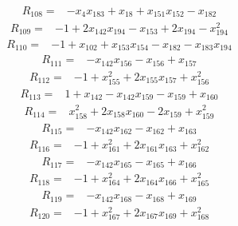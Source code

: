 \[
\begin{aligned}
R_{108}={}&-x_{4}x_{183}+x_{18}+x_{151}x_{152}-x_{182}
\end{aligned}
\]
\[
\begin{aligned}
R_{109}={}&-1+2x_{142}x_{194}-x_{153}+2x_{194}-x_{194}^{2}
\end{aligned}
\]
\[
\begin{aligned}
R_{110}={}&-1+x_{102}+x_{153}x_{154}-x_{182}-x_{183}x_{194}
\end{aligned}
\]
\[
\begin{aligned}
R_{111}={}&-x_{142}x_{156}-x_{156}+x_{157}
\end{aligned}
\]
\[
\begin{aligned}
R_{112}={}&-1+x_{155}^{2}+2x_{155}x_{157}+x_{156}^{2}
\end{aligned}
\]
\[
\begin{aligned}
R_{113}={}&1+x_{142}-x_{142}x_{159}-x_{159}+x_{160}
\end{aligned}
\]
\[
\begin{aligned}
R_{114}={}&x_{158}^{2}+2x_{158}x_{160}-2x_{159}+x_{159}^{2}
\end{aligned}
\]
\[
\begin{aligned}
R_{115}={}&-x_{142}x_{162}-x_{162}+x_{163}
\end{aligned}
\]
\[
\begin{aligned}
R_{116}={}&-1+x_{161}^{2}+2x_{161}x_{163}+x_{162}^{2}
\end{aligned}
\]
\[
\begin{aligned}
R_{117}={}&-x_{142}x_{165}-x_{165}+x_{166}
\end{aligned}
\]
\[
\begin{aligned}
R_{118}={}&-1+x_{164}^{2}+2x_{164}x_{166}+x_{165}^{2}
\end{aligned}
\]
\[
\begin{aligned}
R_{119}={}&-x_{142}x_{168}-x_{168}+x_{169}
\end{aligned}
\]
\[
\begin{aligned}
R_{120}={}&-1+x_{167}^{2}+2x_{167}x_{169}+x_{168}^{2}
\end{aligned}
\]
